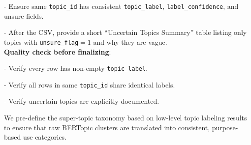 \documentclass[11pt]{article}
\begin{document}
\begin{tcolorbox}
- Ensure same \texttt{topic\_id} has consistent \texttt{topic\_label}, \texttt{label\_confidence}, and unsure fields.

- After the CSV, provide a short ``Uncertain Topics Summary'' table listing only topics with \texttt{unsure\_flag}$=1$ and why they are vague.\\

\textbf{Quality check before finalizing}:

- Verify every row has non-empty \texttt{topic\_label}.

- Verify all rows in same \texttt{topic\_id} share identical labels.

- Verify uncertain topics are explicitly documented.

\end{tcolorbox}

We pre-define the super-topic taxonomy based on low-level topic labeling results to ensure that raw BERTopic clusters are translated into consistent, purpose-based use categories.
\end{document}
